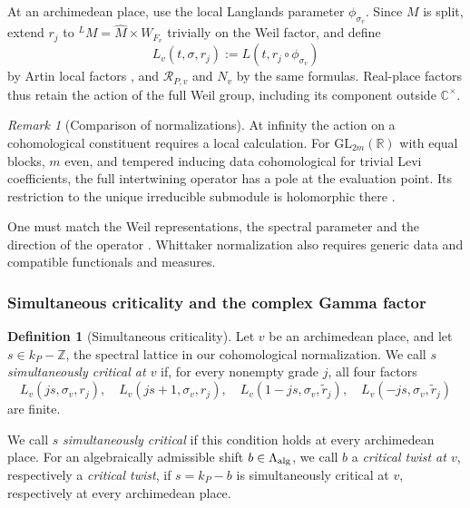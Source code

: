 \documentclass[12pt]{amsart}
\numberwithin{equation}{section}
\theoremstyle{plain}
\theoremstyle{definition}
\newtheorem{definition}[theorem]{Definition}
\theoremstyle{remark}
\newtheorem{remark}[theorem]{Remark}
\newcommand{\R}{\mathbb R}
\newcommand{\GL}{\mathrm{GL}}
\begin{document}
At an archimedean place, use the local Langlands parameter $\phi_{\sigma_v}$. Since $M$ is split, extend $r_j$ to ${}^LM=\widehat M\times W_{F_v}$ trivially on the Weil factor, and define
\[
 L_v(t,\sigma,r_j):=L(t,r_j\circ\phi_{\sigma_v})
\]
by Artin local factors \cite[\S3]{Shahidi1985}, and $\mathcal R_{P,v}$ and $N_v$ by the same formulas. Real-place factors thus retain the action of the full Weil group, including its component outside $\mathbb C^\times$.

\begin{remark}[Comparison of normalizations]\label{rem:factor-conventions}
At infinity the action on a cohomological constituent requires a local
calculation. For $\GL_{2m}(\R)$ with equal blocks, $m$ even, and
tempered inducing data cohomological for trivial Levi coefficients,
the full intertwining operator has a pole at the evaluation point.
Its restriction to the unique irreducible submodule is holomorphic there
\cite[\S4.2]{Clozel2022}.

One must match the Weil representations, the spectral parameter and the direction of the operator \cite[(1.0.1), \S2.3]{RaghuramPadic2023} \cite{Shahidi1990,Shahidi2010}. Whittaker normalization also requires generic data and compatible functionals and measures.
\end{remark}


\subsubsection{Simultaneous criticality and the complex Gamma factor}
\begin{definition}[Simultaneous criticality]\label{def:simultaneous}
Let $v$ be an archimedean place, and let $s\in k_P-\mathbb Z$, the spectral lattice in our cohomological normalization. We call $s$ \emph{simultaneously critical at $v$} if, for every nonempty grade $j$, all four factors 
\begin{equation}\label{eq:four-factors}
 L_v(js,\sigma_v,r_j),\quad
 L_v(js+1,\sigma_v,r_j),\quad
 L_v(1-js,\sigma_v,\widetilde r_j),\quad
 L_v(-js,\sigma_v,\widetilde r_j)
\end{equation}
are finite.
 
We call $s$ \emph{simultaneously critical} if this condition holds at every archimedean place. For an algebraically admissible shift $b\in\Lambda_{\rm alg}$, we call $b$ a \emph{critical twist at $v$}, respectively a \emph{critical twist}, if $s=k_P-b$ is simultaneously critical at $v$, respectively at every archimedean place. 
\end{definition}
\end{document}
